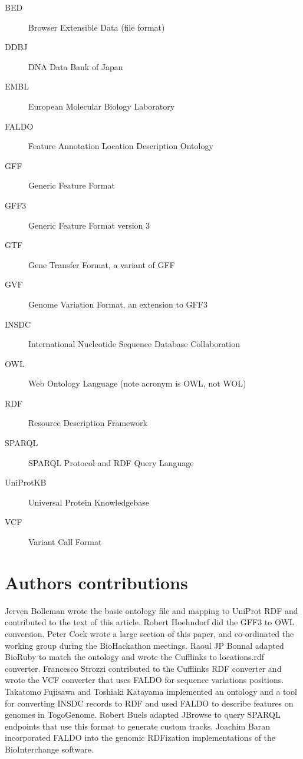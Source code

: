 \documentclass[10pt]{bmc_article}
\newenvironment{bmcformat}{\begin{raggedright}\baselineskip20pt\sloppy\setboolean{publ}{false}}{\end{raggedright}\baselineskip20pt\sloppy}
\begin{document}
\begin{bmcformat}
\begin{description}
\item[BED] Browser Extensible Data (file format)
\item[DDBJ] DNA Data Bank of Japan
\item[EMBL] European Molecular Biology Laboratory
\item[FALDO] Feature Annotation Location Description Ontology
\item[GFF] Generic Feature Format
\item[GFF3] Generic Feature Format version 3
\item[GTF] Gene Transfer Format, a variant of GFF
\item[GVF] Genome Variation Format, an extension to GFF3
\item[INSDC] International Nucleotide Sequence Database Collaboration
\item[OWL] Web Ontology Language (note acronym is OWL, not WOL)
\item[RDF] Resource Description Framework
\item[SPARQL] SPARQL Protocol and RDF Query Language
\item[UniProtKB] Universal Protein Knowledgebase
\item[VCF] Variant Call Format
\end{description}
\bigskip

\section*{Authors contributions}

Jerven Bolleman wrote the basic ontology file and mapping to UniProt RDF and contributed to the text of this article.
Robert Hoehndorf did the GFF3 to OWL conversion.
Peter Cock wrote a large section of this paper, and co-ordinated the
working group during the BioHackathon meetings.
Raoul JP Bonnal adapted BioRuby to match the ontology and wrote the Cufflinks to locations.rdf converter. 
Francesco Strozzi contributed to the Cufflinks RDF converter and wrote the VCF converter that uses FALDO for sequence variations positions.
Takatomo Fujisawa and Toshiaki Katayama implemented an ontology and a tool for converting INSDC records to RDF and used FALDO to describe features on genomes in TogoGenome.
Robert Buels adapted JBrowse to query SPARQL endpoints that use this format to generate custom tracks. 
Joachim Baran incorporated FALDO into the genomic RDFization implementations of the BioInterchange software.


\end{bmcformat}
\end{document}
